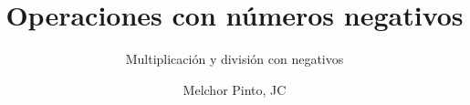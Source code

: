 \documentclass{guia}
\title{Operaciones con números negativos}
\subtitle{Multiplicación y división con negativos}
\author{Melchor Pinto, JC}
\begin{document}
%
\begin{questions}
\questionboxed{}
\end{questions}
\end{document}
